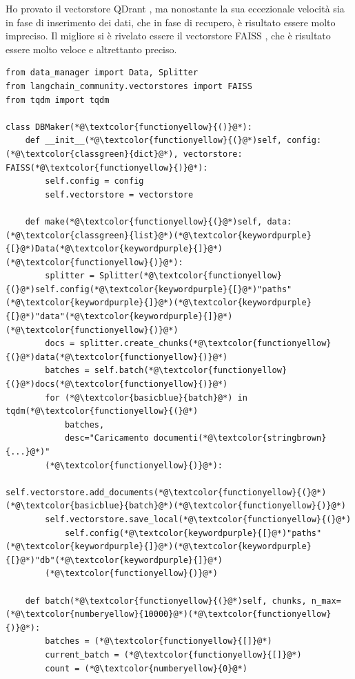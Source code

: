 Ho provato il vectorstore QDrant \cite{qdrant}, ma nonostante la sua eccezionale velocità sia in fase di inserimento dei dati, che in fase di recupero, è risultato essere molto impreciso. Il migliore si è rivelato essere il vectorstore FAISS \cite{faiss,douze2024faisslibrary}, che è risultato essere molto veloce e altrettanto preciso.
\begin{lstlisting}[label=lst:dbmaker, caption={Implementazione del DB Maker}]
from data_manager import Data, Splitter
from langchain_community.vectorstores import FAISS
from tqdm import tqdm

class DBMaker(*@\textcolor{functionyellow}{()}@*):
    def __init__(*@\textcolor{functionyellow}{(}@*)self, config: (*@\textcolor{classgreen}{dict}@*), vectorstore: FAISS(*@\textcolor{functionyellow}{)}@*):
        self.config = config
        self.vectorstore = vectorstore
    
    def make(*@\textcolor{functionyellow}{(}@*)self, data: (*@\textcolor{classgreen}{list}@*)(*@\textcolor{keywordpurple}{[}@*)Data(*@\textcolor{keywordpurple}{]}@*)(*@\textcolor{functionyellow}{)}@*):
        splitter = Splitter(*@\textcolor{functionyellow}{(}@*)self.config(*@\textcolor{keywordpurple}{[}@*)"paths"(*@\textcolor{keywordpurple}{]}@*)(*@\textcolor{keywordpurple}{[}@*)"data"(*@\textcolor{keywordpurple}{]}@*)(*@\textcolor{functionyellow}{)}@*)
        docs = splitter.create_chunks(*@\textcolor{functionyellow}{(}@*)data(*@\textcolor{functionyellow}{)}@*)
        batches = self.batch(*@\textcolor{functionyellow}{(}@*)docs(*@\textcolor{functionyellow}{)}@*)
        for (*@\textcolor{basicblue}{batch}@*) in tqdm(*@\textcolor{functionyellow}{(}@*)
            batches,
            desc="Caricamento documenti(*@\textcolor{stringbrown}{...}@*)"
        (*@\textcolor{functionyellow}{)}@*):
            self.vectorstore.add_documents(*@\textcolor{functionyellow}{(}@*)(*@\textcolor{basicblue}{batch}@*)(*@\textcolor{functionyellow}{)}@*)
        self.vectorstore.save_local(*@\textcolor{functionyellow}{(}@*)
            self.config(*@\textcolor{keywordpurple}{[}@*)"paths"(*@\textcolor{keywordpurple}{]}@*)(*@\textcolor{keywordpurple}{[}@*)"db"(*@\textcolor{keywordpurple}{]}@*)
        (*@\textcolor{functionyellow}{)}@*)
    
    def batch(*@\textcolor{functionyellow}{(}@*)self, chunks, n_max=(*@\textcolor{numberyellow}{10000}@*)(*@\textcolor{functionyellow}{)}@*):
        batches = (*@\textcolor{functionyellow}{[]}@*)
        current_batch = (*@\textcolor{functionyellow}{[]}@*)
        count = (*@\textcolor{numberyellow}{0}@*)


\end{lstlisting}
